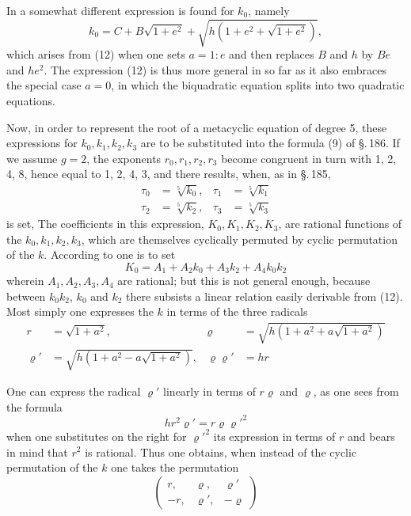 
In  a somewhat different expression is found for $k_0$,
namely
\[
k_0 = C + B\sqrt{1+e^2} + \sqrt{h\left(1+e^2+\sqrt{1+e^2}\right)},
\]
which arises from (12) when one sets $a = 1:e$ and then replaces $B$ and $h$
by $Be$ and $he^2$. The expression (12) is thus more general in so far
as it also embraces the special case $a=0$, in which the
biquadratic equation splits into two quadratic equations.

Now, in order to represent the root of a metacyclic equation of degree
5, these expressions for $k_0, k_1, k_2, k_3$ are to be substituted into
the formula (9) of \S.\,186. If we assume $g=2$, the
exponents $r_0, r_1, r_2, r_3$ become congruent in turn with
1, 2, 4, 8, hence equal to 1, 2, 4, 3, and there results, when, as in
\S.\,185,
\[
\begin{aligned}
\tau_0 &= \sqrt[5]{k_0}, & \tau_1 &= \sqrt[5]{k_1} \\
\tau_2 &= \sqrt[5]{k_2}, & \tau_3 &= \sqrt[5]{k_3}
\end{aligned}
\]
is set,
The coefficients in this expression, $K_0, K_1, K_2, K_3$, are
rational functions of the $k_0, k_1, k_2, k_3$, which are themselves
cyclically permuted by cyclic permutation of the $k$. According to
 one is to set
\[
K_0 = A_1 + A_2 k_0 + A_3 k_2 + A_4 k_0 k_2
\]
wherein $A_1, A_2, A_3, A_4$ are rational; but this is not
general enough, because between $k_0 k_2$, $k_0$ and $k_2$ there subsists a
linear relation easily derivable from (12). Most simply one
expresses the $k$ in terms of the three radicals
\[
\begin{aligned}
r &= \sqrt{1+a^2}, & \varrho &= \sqrt{h\left(1+a^2+a\sqrt{1+a^2}\right)} \\
\varrho' &= \sqrt{h\left(1+a^2-a\sqrt{1+a^2}\right)}, & \varrho\varrho' &= hr
\end{aligned}
\]

One can express the radical $\varrho'$ linearly in terms of $r\varrho$ and
$\varrho$, as one sees from the formula
\[
hr^2\varrho' = r\varrho\varrho'^2
\]
when one substitutes on the right for $\varrho'^2$ its expression in terms of $r$
and bears in mind that $r^2$ is rational. Thus one obtains, when
instead of the cyclic permutation of the $k$ one takes the permutation
\[
\begin{pmatrix}
r, & \varrho, & \varrho' \\
-r, & \varrho', & -\varrho
\end{pmatrix}
\]
